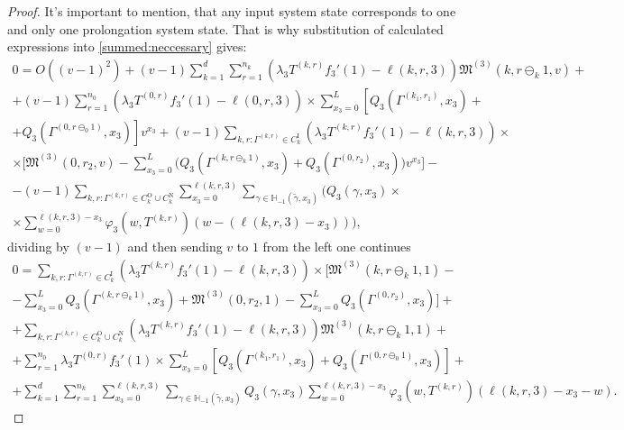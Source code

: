 \documentclass[runningheads,a4paper]{llncs}
\begin{document}
\begin{proof}
It's important to mention, that any input system state corresponds to one and only one prolongation system state. That is why substitution of calculated expressions into \eqref{summed:neccessary} gives:
\begin{multline}
 0 = O((v-1)^2) + (v-1) \sum_{k=1}^{d}\sum_{r=1}^{n_{k}} (\lambda_3 T^{(k,r)} f_3'(1) - \ell(k,r,3)) \mathfrak{M}^{(3)}(k,r\ominus_{k} 1,v)   +\\+  (v-1) \sum_{r=1}^{n_0} (\lambda_3 T^{(0,r)} f_3'(1) - \ell(0,r,3))  \times \sum_{x_3=0}^{L} \left[ Q_3(\Gamma^{(k_1,r_1)},x_3) \right. +\\ \left. + Q_3(\Gamma^{(0,r\ominus_0 1)},x_3) \right] v^{x_3}  + (v-1) \sum_{k,r\colon \Gamma^{(k, r)} \in C_{k}^{\mathrm{I}}} (\lambda_3 T^{(k,r)} f_3'(1) - \ell(k,r,3))\times \\ 
     \times \biggl[ \mathfrak{M}^{(3)}(0,r_2,v) -   \sum_{x_3=0}^L\bigl(Q_3(\Gamma^{(k,r\ominus_{k} 1)},x_3) + Q_3(\Gamma^{(0,r_2)},x_3) \bigr) v^{x_3} \biggr] -\\- (v-1)\sum_{k,r\colon \Gamma^{(k, r)} \in C_{k}^{\mathrm{O}}\cup C_{k}^{\mathrm{N}}} \sum_{x_3=0}^{\ell(k,r,3)}\sum_{\gamma \in {\mathbb H}_{-1}(\tilde{\gamma},x_3)} \bigg(Q_3(\gamma,x_3) \times \\ \times \sum_{w=0}^{\ell(k,r,3) - x_3} \varphi_3(w,T^{(k,r)}) (w-(\ell(k,r,3)-x_3)) \bigg),
\end{multline}
dividing by $(v-1)$ and then sending $v$ to $1$ from the left one continues
\begin{multline}
 0 = \sum_{k,r\colon \Gamma^{(k, r)} \in C_{k}^{\mathrm{I}}} (\lambda_3 T^{(k,r)} f_3'(1) - \ell(k,r,3))
     \times \biggl[\mathfrak{M}^{(3)}(k,r\ominus_{k} 1,1) - \\ - \sum_{x_3=0}^L Q_3(\Gamma^{(k,r\ominus_{k} 1)},x_3)   +  \mathfrak{M}^{(3)}(0,r_2,1) -   \sum_{x_3=0}^L  Q_3(\Gamma^{(0,r_2)},x_3)  \biggr]
 +\\+ \sum_{k,r\colon \Gamma^{(k, r)} \in C_{k}^{\mathrm{O}}\cup C_{k}^{\mathrm{N}}} (\lambda_3 T^{(k,r)} f_3'(1) - \ell(k,r,3)) \mathfrak{M}^{(3)}(k,r\ominus_{k} 1,1)   +\\+ \sum_{r=1}^{n_0} \lambda_3 T^{(0,r)} f_3'(1)  \times \sum_{x_3=0}^{L} \left[ Q_3(\Gamma^{(k_1,r_1)},x_3) + Q_3(\Gamma^{(0,r\ominus_0 1)},x_3) \right]   +\\+  \sum_{k=1}^{d}\sum_{r=1}^{n_{k}} \sum_{x_3=0}^{\ell(k,r,3)}\!\!\sum_{\gamma \in {\mathbb H}_{-1}(\tilde{\gamma},x_3)} \!\!\!Q_3(\gamma,x_3) \!\!\!\!\sum_{w=0}^{\ell(k,r,3) - x_3} \!\!\!\!\!\!\varphi_3(w,T^{(k,r)}) (\ell(k,r,3)-x_3 - w).
 \label{neccessary:to:paste}
\end{multline}


\end{proof}
\end{document}
